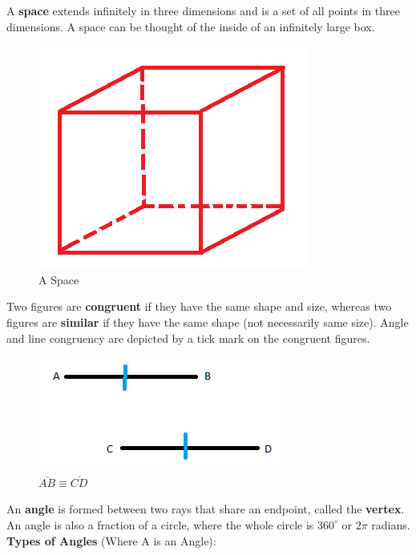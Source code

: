 \documentclass{article}
\begin{document}
            \noindent A \textbf{space} extends infinitely in three dimensions and is a set of all
            points in three dimensions. A space can be thought of the inside of an infinitely large
            box. \\

            \begin{figure} [hbt!]
                \centering
                \includegraphics[scale = 0.3] {Resources/Unit1Basics/space.PNG}
                \caption*{A Space}
            \end{figure}

            \noindent Two figures are \textbf{congruent} if they have the same shape and size,
            whereas two figures are \textbf{similar} if they have the same shape (not necessarily
            same size). Angle and line congruency are depicted by a tick mark on the congruent
            figures. \\

            \begin{figure} [hbt!]
                \centering
                \includegraphics[scale = 0.75] {Resources/Unit1Basics/congruent.PNG}
                \caption*{$\overline{AB}\equiv\overline{CD}$}
            \end{figure}

            \noindent An \textbf{angle} is formed between two rays that share an endpoint, called
            the \textbf{vertex}. An angle is also a fraction of a circle, where the whole circle is
            $360^\circ$ or $2\pi$ radians. \textbf{Types of Angles} (Where A is an Angle): \\
\end{document}
